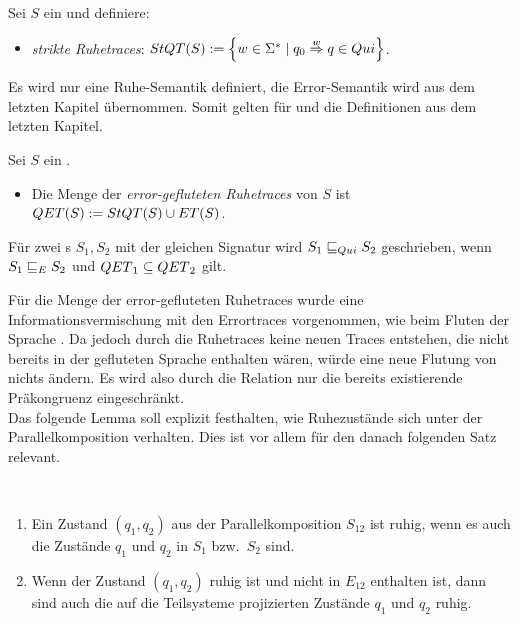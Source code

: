 \begin{Def}[Ruhetraces]
\label{DefRuhetraces}
  Sei $S$ ein \EIO{} und definiere:
  \begin{itemize}
    \item \emph{strikte Ruhetraces}: $StQT{}(S) := \left\{w\in\Sigma ^*\mid q_0
      \overset{w}{\Rightarrow} q\in Qui\right\}$.
  \end{itemize}
\end{Def}

Es wird nur eine Ruhe-Semantik definiert, die Error-Semantik wird aus
dem letzten Kapitel übernommen. Somit gelten für \ET{} und \EL{} die
Definitionen aus dem letzten Kapitel.

\begin{Def}
\label{DefQTQL}
  Sei $S$ ein \EIO{}.
  \begin{itemize}
    \item Die Menge der \emph{error-gefluteten Ruhetraces} von $S$ ist
      $QET{}(S) := StQT{}(S)\cup ET{}(S)$.
  \end{itemize}
  Für zwei \EIO{}s $S_1, S_2$ mit der gleichen Signatur wird
  $S_1\sqsubseteq _{Qui} S_2$ geschrieben, wenn $S_1\sqsubseteq _E S_2$ und $QET{}_1\subseteq
  QET{}_2$ gilt.
\end{Def}

Für die Menge der error-gefluteten Ruhetraces \QT{} wurde eine Informationsvermischung
mit den Errortraces vorgenommen, wie beim Fluten der Sprache \EL{}. Da jedoch
durch die Ruhetraces keine neuen Traces entstehen, die nicht bereits in der
gefluteten Sprache \EL{} enthalten wären, würde eine neue Flutung von \EL{}
nichts ändern. Es wird also durch die Relation \QRel{} nur die
bereits existierende Präkongruenz \ERel{} eingeschränkt.\\
Das folgende Lemma soll explizit festhalten, wie Ruhezustände sich unter der
Parallelkomposition verhalten. Dies ist vor allem für den danach folgenden Satz
relevant.

\pagebreak

\begin{lem}
\label{lemRuheParallelkomp}
  ~
  \begin{enumerate}
    \item Ein Zustand $(q_1,q_2)$ aus der Parallelkomposition $S_{12}$
      ist ruhig, wenn es auch die Zustände $q_1$ und $q_2$ in $S_1$ bzw.\ $S_2$
      sind.
    \item Wenn der Zustand $(q_1,q_2)$ ruhig ist und nicht in $E_{12}$
      enthalten ist, dann sind auch die auf die Teilsysteme projizierten
      Zustände $q_1$ und $q_2$ ruhig.
  \end{enumerate}
\end{lem}

